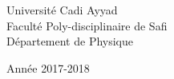 \documentclass{article}
\begin{document}
\begin{minipage}{.5\textwidth}%
\begin{flushleft}
\hspace*{-0.6cm}
Université Cadi Ayyad\\
\hspace*{-0.6cm}
Faculté Poly-disciplinaire de Safi\\
\hspace*{-0.6cm}
Département de Physique
\end{flushleft}
\end{minipage}%
\hfill
\begin{minipage}{.3\textwidth}%
\begin{flushright}
Année 2017-2018
\end{flushright}
\end{minipage}%
\end{document}
